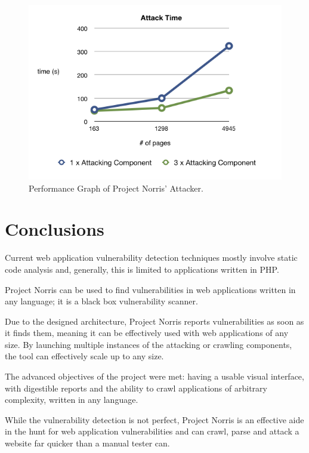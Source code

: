 \documentclass[12pt,a4paper]{article}
\begin{document}
\begin{figure}[!ht]
    \begin{center}
        \includegraphics[scale=0.7]{images/attack_performance.png}    
    \end{center}
    \caption{Performance Graph of Project Norris' Attacker.}
    \label{fig:performance2}
\end{figure}

\section{Conclusions}

Current web application vulnerability detection techniques mostly involve static code analysis and, generally, this is limited to applications written in PHP.

Project Norris can be used to find vulnerabilities in web applications written in any language; it is a black box vulnerability scanner. 

Due to the designed architecture, Project Norris reports vulnerabilities as soon as it finds them, meaning it can be effectively used with web applications of any size.  By launching multiple instances of the attacking or crawling components, the tool can effectively scale up to any size.

The advanced objectives of the project were met: having a usable visual interface, with digestible reports and the ability to crawl applications of arbitrary complexity, written in any language.

While the vulnerability detection is not perfect, Project Norris is an effective aide in the hunt for web application vulnerabilities and can crawl, parse and attack a website far quicker than a manual tester can.


\end{document}
